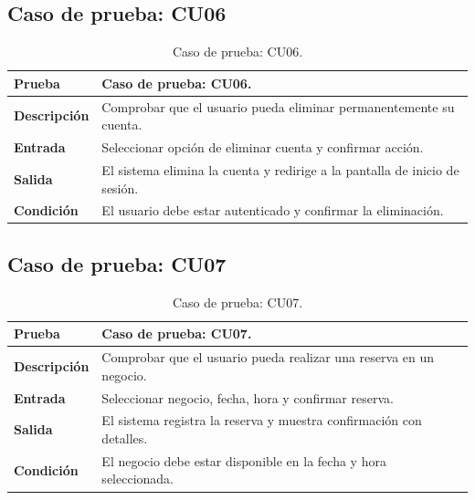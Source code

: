 
\subsection{Caso de prueba: CU06}

\begin{table}[ht]
\centering
\renewcommand{\arraystretch}{1.3}
\begin{tabular}{|p{3cm}|p{12cm}|}
\hline
\rowcolor[RGB]{191,191,191}
\textbf{Prueba} & Caso de prueba: CU06. \\
\hline
\textbf{Descripción} \cellcolor[RGB]{217,217,217} & Comprobar que el usuario pueda eliminar permanentemente su cuenta. \\
\hline
\textbf{Entrada} \cellcolor[RGB]{217,217,217} & Seleccionar opción de eliminar cuenta y confirmar acción. \\
\hline
\textbf{Salida} \cellcolor[RGB]{217,217,217} & El sistema elimina la cuenta y redirige a la pantalla de inicio de sesión. \\
\hline
\textbf{Condición} \cellcolor[RGB]{217,217,217} & El usuario debe estar autenticado y confirmar la eliminación. \\
\hline
\end{tabular}
\caption{Caso de prueba: CU06.}
\label{tab:cu06_black_test}
\end{table}


\subsection{Caso de prueba: CU07}

\begin{table}[ht]
\centering
\renewcommand{\arraystretch}{1.3}
\begin{tabular}{|p{3cm}|p{12cm}|}
\hline
\rowcolor[RGB]{191,191,191}
\textbf{Prueba} & Caso de prueba: CU07. \\
\hline
\textbf{Descripción} \cellcolor[RGB]{217,217,217} & Comprobar que el usuario pueda realizar una reserva en un negocio. \\
\hline
\textbf{Entrada} \cellcolor[RGB]{217,217,217} & Seleccionar negocio, fecha, hora y confirmar reserva. \\
\hline
\textbf{Salida} \cellcolor[RGB]{217,217,217} & El sistema registra la reserva y muestra confirmación con detalles. \\
\hline
\textbf{Condición} \cellcolor[RGB]{217,217,217} & El negocio debe estar disponible en la fecha y hora seleccionada. \\
\hline
\end{tabular}
\caption{Caso de prueba: CU07.}
\label{tab:cu07_black_test}
\end{table}

